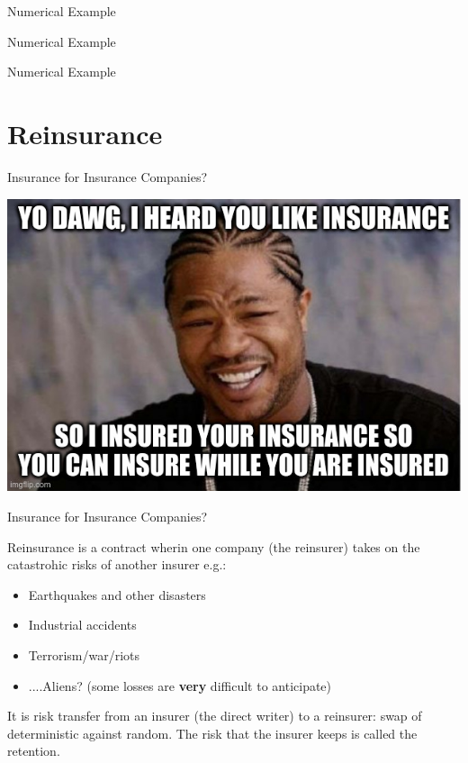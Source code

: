 \documentclass[11pt]{beamer}
\begin{document}
\begin{frame}{Numerical Example}

\end{frame}
\begin{frame}{Numerical Example}

\end{frame}
\begin{frame}{Numerical Example}

\end{frame}
\section{ Reinsurance }
\begin{frame}{Insurance for Insurance Companies?}

\includegraphics[scale=.5]{ClassMeme.jpeg}

\end{frame}
\begin{frame}{Insurance for Insurance Companies?}

Reinsurance is a contract wherin one company (the reinsurer) takes on the catastrohic risks of another insurer e.g.:

\begin{itemize}
\item Earthquakes and other disasters 

\item Industrial accidents 

\item Terrorism/war/riots

\item ....Aliens? (some losses are \textbf{very} difficult to anticipate)

\end{itemize}
\vfill
It is \alert{risk transfer} from an insurer (the direct writer) to a reinsurer: swap of deterministic against random. The risk that the insurer keeps is called the \alert{retention}.

\end{frame}
\end{document}
